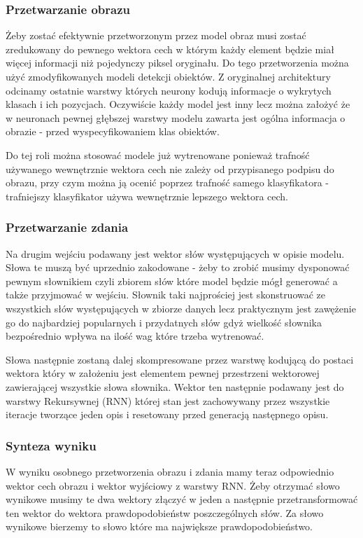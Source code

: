 \subsubsection{Przetwarzanie obrazu}
Żeby zostać efektywnie przetworzonym przez model obraz musi zostać zredukowany do pewnego wektora cech w którym każdy element będzie miał więcej informacji niż pojedynczy piksel oryginału. Do tego przetworzenia można użyć zmodyfikowanych modeli detekcji obiektów. Z oryginalnej architektury odcinamy ostatnie warstwy których neurony kodują informacje o wykrytych klasach i ich pozycjach. Oczywiście każdy model jest inny lecz można założyć że w neuronach pewnej głębszej warstwy modelu zawarta jest ogólna informacja o obrazie - przed wyspecyfikowaniem klas obiektów.

Do tej roli można stosować modele już wytrenowane ponieważ trafność używanego wewnętrznie wektora cech nie zależy od przypisanego podpisu do obrazu, przy czym można ją ocenić poprzez trafność samego klasyfikatora - trafniejszy klasyfikator używa wewnętrznie lepszego wektora cech.
\subsubsection{Przetwarzanie zdania}
Na drugim wejściu podawany jest wektor słów występujących w opisie modelu. Słowa te muszą być uprzednio zakodowane - żeby to zrobić musimy dysponować pewnym słownikiem czyli zbiorem słów które model będzie mógł generować a także przyjmować w wejściu. Słownik taki najprościej jest skonstruować ze wszystkich słów występujących w zbiorze danych lecz praktycznym jest zawężenie go do najbardziej popularnych i przydatnych słów gdyż wielkość słownika bezpośrednio wpływa na ilość wag które trzeba wytrenować.

Słowa następnie zostaną dalej skompresowane przez warstwę kodującą do postaci wektora który w założeniu jest elementem pewnej przestrzeni wektorowej zawierającej wszystkie słowa słownika. Wektor ten następnie podawany jest do warstwy Rekursywnej (RNN) której stan jest zachowywany przez wszystkie iteracje tworzące jeden opis i resetowany przed generacją następnego opisu.
\subsubsection{Synteza wyniku}
W wyniku osobnego przetworzenia obrazu i zdania mamy teraz odpowiednio wektor cech obrazu i wektor wyjściowy z warstwy RNN. Żeby otrzymać słowo wynikowe musimy te dwa wektory złączyć w jeden a następnie przetransformować ten wektor do wektora prawdopodobieństw poszczególnych słów. Za słowo wynikowe bierzemy to słowo które ma największe prawdopodobieństwo.

